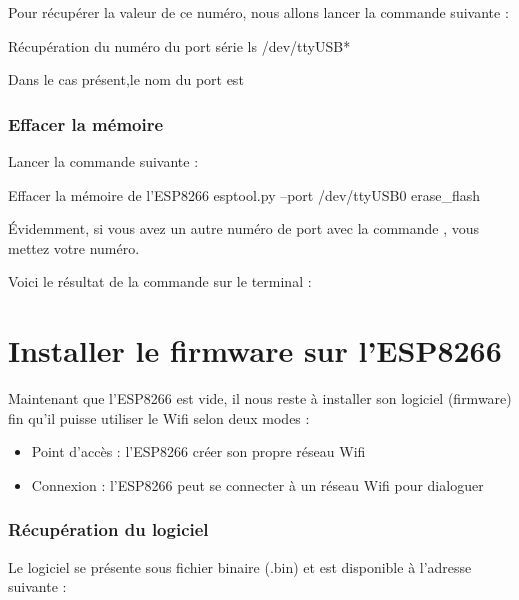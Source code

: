 Pour récupérer la valeur de ce numéro, nous allons lancer la commande suivante : 

\begin{Bash}{Récupération du numéro du port série}
ls /dev/ttyUSB*
\end{Bash}


Dans le cas présent,le nom du port est 

\subsection{Effacer la mémoire}

Lancer la commande suivante : 
\begin{Bash}{Effacer la mémoire de l'ESP8266}
esptool.py --port /dev/ttyUSB0 erase_flash
\end{Bash}

Évidemment, si vous avez un autre numéro de port avec la commande , vous mettez votre numéro.

Voici le résultat de la commande sur le terminal : 



\chapter{Installer le firmware sur l'ESP8266}

Maintenant que l'ESP8266 est vide, il nous reste à installer son logiciel (firmware) fin qu'il puisse utiliser le Wifi selon deux modes : 

\begin{itemize}
    \item Point d'accès : l'ESP8266 créer son propre réseau Wifi
    \item Connexion : l'ESP8266 peut se connecter à un réseau Wifi pour dialoguer
\end{itemize}

\subsection{Récupération du logiciel}

Le logiciel se présente sous fichier binaire (.bin) et est disponible à l'adresse suivante : \\

